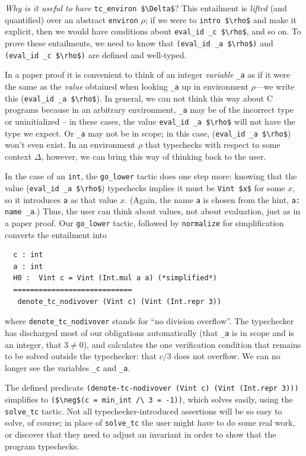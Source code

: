 \documentclass{puthesis}
\begin{document}
\emph{Why is it useful to have} \lstinline{tc_environ $\Delta$}?
This entailment is \emph{lifted} (and quantified) over an abstract
\lstinline|environ| $\rho$; if we were to \lstinline|intro $\rho$| and make it
explicit, then we would have conditions about \lstinline{eval_id _c $\rho$},
and so on.  
To prove these entailments, we need to know that
\lstinline{(eval_id _a $\rho$)}  and 
\lstinline{(eval_id _c $\rho$)}  are defined and well-typed.

In a paper proof it is convenient to think of an integer
\emph{variable} \lstinline{_a} as if it were the same as the
\emph{value} obtained when looking \lstinline{_a} up in environment
$\rho$---we write this (\lstinline|eval_id _a $\rho$|). In general, we
can not think this way about C programs because in an arbitrary
environment, \lstinline|_a| may be of the incorrect type or
uninitialized -- in these cases, the value 
\lstinline|eval_id _a $\rho$| will not have the type we expect.  Or \lstinline|_a| may not
be in scope; in this case, (\lstinline|eval_id _a $\rho$|) won't even exist. In
an environment $\rho$ that typechecks with respect to some context
$\Delta$, however, we can bring this way of thinking back to the user.

In the case of an \lstinline{int}, the \lstinline|go_lower| tactic does one step more:
knowing that the value (\lstinline|eval_id _a $\rho$|) typechecks
implies it must be \lstinline|Vint $x$| for some $x$, so it introduces
\lstinline|a| as that value $x$.  (Again, the name \lstinline|a| is
chosen from the hint, \lstinline|a: name _a|.)  Thus, the user can
think about values, not about evaluation, just as in a paper proof.
Our \lstinline|go_lower| tactic, followed by \lstinline|normalize| for
simplification converts the entailment into

\begin{lstlisting}
  c : int
  a : int
  H0 :  Vint c = Vint (Int.mul a a) (*simplified*)
  ============================
   denote_tc_nodivover (Vint c) (Vint (Int.repr 3))
\end{lstlisting}
where \lstinline|denote_tc_nodivover| stands for ``no division
overflow''. The typechecker has discharged most of our obligations
automatically (that \lstinline|_a| is in scope and is an integer, that
$3 \neq 0$),
and calculates the one verification condition that remains to be
solved outside the typechecker: that $c/3$ does not overflow.  We can no longer see the
variables \lstinline|_c| and \lstinline|_a|.

The defined predicate \lstinline|(denote-tc-nodivover (Vint c) (Vint (Int.repr 3)))|
simplifies to \lstinline|($\neg$(c = min_int /\ 3 = -1))|,
which solves easily, using the \lstinline|solve_tc| tactic.
Not all typechecker-introduced assertions will be so easy
to solve, of course; in place of \lstinline|solve_tc|
the user might have to do some real work, or discover that they need
to adjust an invariant in order to show that the program typechecks.
\end{document}

